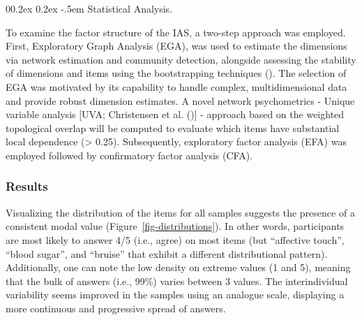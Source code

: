 \documentclass[
  man,
  floatsintext,
  longtable,
  nolmodern,
  notxfonts,
  notimes,
  colorlinks=true,linkcolor=blue,citecolor=blue,urlcolor=blue]{apa7}
\makeatletter
\renewcommand{\paragraph}{\@startsection{paragraph}{4}{\parindent}%
	{0\baselineskip \@plus 0.2ex \@minus 0.2ex}%
	{-.5em}%
	{\normalfont\normalsize\bfseries\typesectitle}}
\makeatother
\begin{document}


\paragraph{Statistical Analysis.}\label{statistical-analysis}

To examine the factor structure of the IAS, a two-step approach was
employed. First, Exploratory Graph Analysis (EGA), was used to estimate
the dimensions via network estimation and community detection, alongside
assessing the stability of dimensions and items using the bootstrapping
techniques (). The selection of EGA was motivated by its capability to handle
complex, multidimensional data and provide robust dimension estimates. A
novel network psychometrics - Unique variable analysis {[}UVA;
Christensen et al. (){]} -
approach based on the weighted topological overlap will be computed to
evaluate which items have substantial local dependence (\textgreater{}
0.25). Subsequently, exploratory factor analysis (EFA) was employed
followed by confirmatory factor analysis (CFA).

\subsubsection{Results}\label{results}

Visualizing the distribution of the items for all samples suggests the
presence of a consistent modal value (Figure~\ref{fig-distributions}).
In other words, participants are most likely to answer 4/5 (i.e., agree)
on most items (but ``affective touch'', ``blood sugar'', and ``bruise''
that exhibit a different distributional pattern). Additionally, one can
note the low density on extreme values (1 and 5), meaning that the bulk
of answers (i.e., 99\%) varies between 3 values. The interindividual
variability seems improved in the samples using an analogue scale,
displaying a more continuous and progressive spread of answers.
\end{document}
